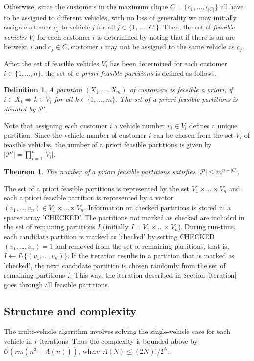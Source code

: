 \documentclass[dissertation,draft*]{aaltoseries}
\newtheorem{theorem}{Theorem}
\newtheorem*{definition}{Definition}
\begin{document}
Otherwise, since the customers in the maximum clique $C = \{c_1,\ldots,c_{|C|}\}$ all have to be assigned to different vehicles, 
with no loss of generality we may initially assign customer $c_j$ to vehicle $j$ for all $j \in \{1,\ldots,|C|\}$.
Then, the set of \emph{feasible vehicles} $V_i$ for each customer $i$ is determined by noting that if there is an 
arc between $i$ and $c_j \in C$, customer $i$ may not be assigned to the same vehicle as $c_j$.

After the set of feasible vehicles $V_i$ has been determined for each customer $i \in \{1,\ldots,n\}$,
the set of \emph{a priori feasible partitions} is defined as follows.
\begin{definition}
A partition $(X_1,\ldots,X_m)$ of customers is feasible a priori, if $i \in X_k \Rightarrow k \in V_i$ for all $k \in \{1,\ldots,m\}$.
The set of a priori feasible partitions is denoted by $\mathcal{P}'$.
\end{definition}
Note that assigning each customer $i$ a vehicle number $v_i \in V_i$ defines a unique partition.
Since the vehicle number of customer $i$ can be chosen from the set $V_i$ of feasible vehicles, 
the number of a priori feasible partitions is given by $|\mathcal{P}'| = \prod_{i=1}^n |V_i|$.

\begin{theorem}
\label{partitions}
The number of a priori feasible partitions satisfies $|\mathcal{P}| \leq m^{n-|C|}$.
\end{theorem}

The set of a priori feasible partitions is represented by the set $V_1 \times \ldots \times V_n$ and each a 
priori feasible partition is represented by a vector $(v_1,\ldots,v_n) \in V_1 \times \ldots \times V_n$.
Information on checked partitions is stored in a sparse array 'CHECKED'.
The partitions not marked as checked are included in the set of remaining partitions $I$
(initially $I = V_1 \times \ldots \times V_n$).
During run-time, each candidate partition is marked as 'checked' by setting CHECKED$(v_1,\ldots,v_n) = 1$ and
removed from the set of remaining partitions, that is, $I \leftarrow I \setminus \{(v_1,\ldots,v_n)\}$.
If the iteration results in a partition that is marked as 'checked', the 
next candidate partition is chosen randomly from the set of remaining partitions $I$.
This way, the iteration described in Section \ref{iteration} goes through all feasible partitions.



\subsection{Structure and complexity}
\label{mvstructure}
The multi-vehicle algorithm involves solving the single-vehicle case
for each vehicle in $r$ iterations. Thus the complexity is bounded above by $\mathcal{O}\left(rm(n^3+A(n))\right)$, 
where $A(N) \leq (2N)!/2^N$.                                                                                                                  
\end{document}

